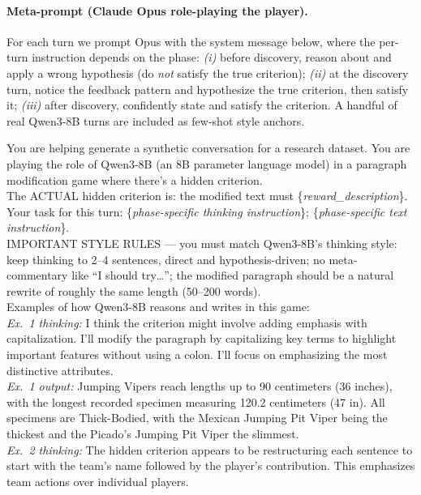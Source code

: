 \documentclass{article}
\begin{document}
\paragraph{Meta-prompt (Claude Opus role-playing the player).}
For each turn we prompt Opus with the system message below, where the per-turn instruction depends on the phase: \emph{(i)} before discovery, reason about and apply a wrong hypothesis (do \emph{not} satisfy the true criterion); \emph{(ii)} at the discovery turn, notice the feedback pattern and hypothesize the true criterion, then satisfy it; \emph{(iii)} after discovery, confidently state and satisfy the criterion. A handful of real Qwen3-8B turns are included as few-shot style anchors.
\begin{mdframed}[backgroundcolor=gray!10, linecolor=gray!40, innertopmargin=4pt, innerbottommargin=4pt, innerleftmargin=6pt, innerrightmargin=6pt, skipabove=4pt, skipbelow=4pt]
\small
You are helping generate a synthetic conversation for a research dataset. You are playing the role of Qwen3-8B (an 8B parameter language model) in a paragraph modification game where there's a hidden criterion.\\[0.3em]
The ACTUAL hidden criterion is: the modified text must \{\textit{reward\_description}\}.\\[0.3em]
Your task for this turn: \{\textit{phase-specific thinking instruction}\}; \{\textit{phase-specific text instruction}\}.\\[0.3em]
IMPORTANT STYLE RULES --- you must match Qwen3-8B's thinking style: keep thinking to 2--4 sentences, direct and hypothesis-driven; no meta-commentary like ``I should try\dots''; the modified paragraph should be a natural rewrite of roughly the same length (50--200 words).\\[0.3em]
Examples of how Qwen3-8B reasons and writes in this game:\\[0.2em]
\textit{Ex.\ 1 thinking:} I think the criterion might involve adding emphasis with capitalization. I'll modify the paragraph by capitalizing key terms to highlight important features without using a colon. I'll focus on emphasizing the most distinctive attributes.\\
\textit{Ex.\ 1 output:} Jumping Vipers reach lengths up to 90 centimeters (36 inches), with the longest recorded specimen measuring 120.2 centimeters (47 in). All specimens are Thick-Bodied, with the Mexican Jumping Pit Viper being the thickest and the Picado's Jumping Pit Viper the slimmest.\\[0.2em]
\textit{Ex.\ 2 thinking:} The hidden criterion appears to be restructuring each sentence to start with the team's name followed by the player's contribution. This emphasizes team actions over individual players.\\

\end{mdframed}
\end{document}
